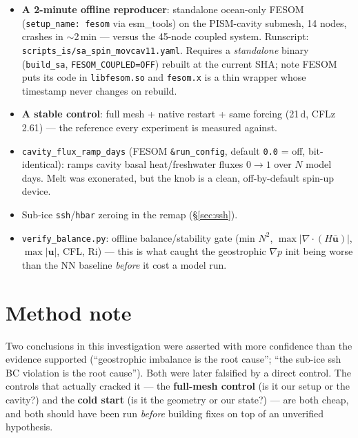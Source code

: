 \documentclass[11pt,a4paper]{article}
\newcommand{\code}[1]{\texttt{\small #1}}
\begin{document}
\begin{itemize}
\item \textbf{A 2-minute offline reproducer}: standalone ocean-only FESOM (\code{setup\_name:
      fesom} via esm\_tools) on the PISM-cavity submesh, 14 nodes, crashes in $\sim$2\,min ---
      versus the 45-node coupled system. Runscript:
      \code{scripts\_is/sa\_spin\_movcav11.yaml}. Requires a \emph{standalone} binary
      (\code{build\_sa}, \code{FESOM\_COUPLED=OFF}) rebuilt at the current SHA; note FESOM puts
      its code in \code{libfesom.so} and \code{fesom.x} is a thin wrapper whose timestamp never
      changes on rebuild.
\item \textbf{A stable control}: full mesh + native restart + same forcing (21\,d, CFLz 2.61) ---
      the reference every experiment is measured against.
\item \code{cavity\_flux\_ramp\_days} (FESOM \code{\&run\_config}, default \code{0.0} = off,
      bit-identical): ramps cavity basal heat/freshwater fluxes $0\to1$ over $N$ model days.
      Melt was exonerated, but the knob is a clean, off-by-default spin-up device.
\item Sub-ice \code{ssh}/\code{hbar} zeroing in the remap (\S\ref{sec:ssh}).
\item \code{verify\_balance.py}: offline balance/stability gate (min $N^2$,
      $\max|\nabla\!\cdot\!(H\bar{\mathbf{u}})|$, $\max|\mathbf{u}|$, CFL, Ri) --- this is what
      caught the geostrophic $\nabla p$ init being worse than the NN baseline \emph{before} it
      cost a model run.
\end{itemize}

\section{Method note}

Two conclusions in this investigation were asserted with more confidence than the evidence
supported (``geostrophic imbalance is the root cause''; ``the sub-ice ssh BC violation is the
root cause''). Both were later falsified by a direct control. The controls that actually cracked
it --- the \textbf{full-mesh control} (is it our setup or the cavity?) and the \textbf{cold
start} (is it the geometry or our state?) --- are both cheap, and both should have been run
\emph{before} building fixes on top of an unverified hypothesis.
\end{document}
